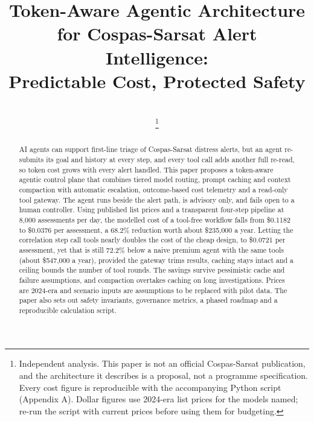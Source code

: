 \documentclass[conference]{IEEEtran}
\begin{document}
\title{Token-Aware Agentic Architecture for Cospas-Sarsat Alert Intelligence:\\
Predictable Cost, Protected Safety}
\author{
     \\
    \thanks{Independent analysis. This paper is not an official Cospas-Sarsat publication, and the architecture it describes is a proposal, not a programme specification. Every cost figure is reproducible with the accompanying Python script (Appendix A). Dollar figures use 2024-era list prices for the models named; re-run the script with current prices before using them for budgeting.}
}

\maketitle

\begin{abstract}
AI agents can support first-line triage of Cospas-Sarsat distress alerts, but an agent re-submits its goal and history at every step, and every tool call adds another full re-read, so token cost grows with every alert handled. This paper proposes a token-aware agentic control plane that combines tiered model routing, prompt caching and context compaction with automatic escalation, outcome-based cost telemetry and a read-only tool gateway. The agent runs beside the alert path, is advisory only, and fails open to a human controller. Using published list prices and a transparent four-step pipeline at 8,000 assessments per day, the modelled cost of a tool-free workflow falls from \$0.1182 to \$0.0376 per assessment, a 68.2\% reduction worth about \$235,000 a year. Letting the correlation step call tools nearly doubles the cost of the cheap design, to \$0.0721 per assessment, yet that is still 72.2\% below a naive premium agent with the same tools (about \$547,000 a year), provided the gateway trims results, caching stays intact and a ceiling bounds the number of tool rounds. The savings survive pessimistic cache and failure assumptions, and compaction overtakes caching on long investigations. Prices are 2024-era and scenario inputs are assumptions to be replaced with pilot data. The paper also sets out safety invariants, governance metrics, a phased roadmap and a reproducible calculation script.
\end{abstract}
\end{document}
